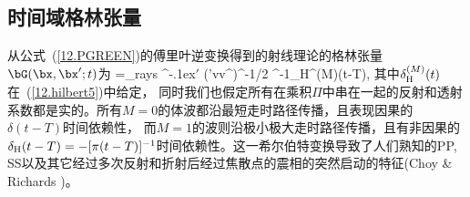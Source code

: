 \renewcommand{\thesubsection}{$\!\!\!\raise1.3ex\hbox{$\star$}\!\!$
\arabic{chapter}.\arabic{section}.\arabic{subsection}}
\subsection{时间域格林张量}
%
%
\renewcommand{\thesubsection}{\arabic{chapter}.
\arabic{section}.\arabic{subsection}}

从公式~(\ref{12.PGREEN})的傅里叶逆变换得到的射线理论的格林张量$\bG(\bx,\bx';t)$为
\eq \label{12.timeGreen}
\bG=\sum_{\rm rays}
\betah\betah^{\raise-.1ex\hbox{$\scriptstyle\prime$}}
(\rho\rho'vv^{})^{-1/2}\hspace{0.2 mm}
\Pi\hspace{0.2 mm}\sR^{-1}\delta_{\rm H}^{(M)}(t-T),
\en
其中$\delta_{\rm H}^{(M)}(t)$在~(\ref{12.hilbert5})中给定， 同时我们也假定所有在乘积$\Pi$中串在一起的反射和透射系数都是实的。所有$M=0$的体波都沿最短走时路径传播，且表现因果的$\delta(t-T)$时间依赖性，
%
而$M=1$的波则沿极小极大走时路径传播，且有非因果的$\delta_{\rm H}(t-T)=-[\pi(t-T)]^{-1}$时间依赖性。这一希尔伯特变换导致了人们熟知的PP, SS以及其它经过多次反射和折射后经过焦散点的震相的突然启动的特征(Choy \& Richards \citeyear{choy&richards75})。

